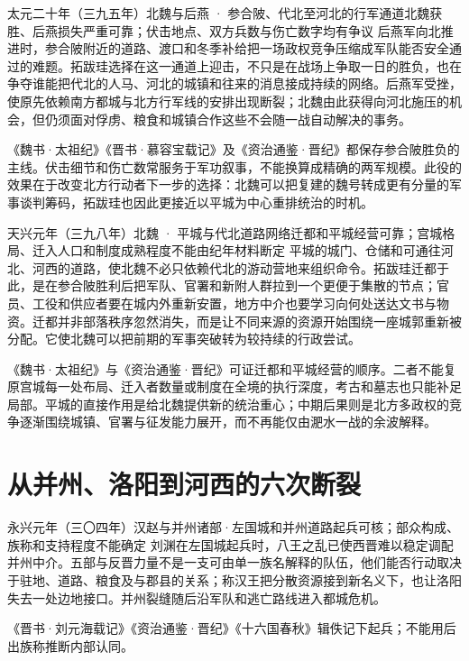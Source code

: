 \begin{event}{}{太元二十年（三九五年）}{北魏与后燕 · 参合陂、代北至河北的行军通道}{北魏获胜、后燕损失严重可靠；伏击地点、双方兵数与伤亡数字均有争议}
后燕军向北推进时，参合陂附近的道路、渡口和冬季补给把一场政权竞争压缩成军队能否安全通过的难题。拓跋珪选择在这一通道上迎击，不只是在战场上争取一日的胜负，也在争夺谁能把代北的人马、河北的城镇和往来的消息接成持续的网络。后燕军受挫，使原先依赖南方都城与北方行军线的安排出现断裂；北魏由此获得向河北施压的机会，但仍须面对俘虏、粮食和城镇合作这些不会随一战自动解决的事务。

《魏书·太祖纪》《晋书·慕容宝载记》及《资治通鉴·晋纪》都保存参合陂胜负的主线。伏击细节和伤亡数常服务于军功叙事，不能换算成精确的两军规模。此役的效果在于改变北方行动者下一步的选择：北魏可以把复建的魏号转成更有分量的军事谈判筹码，拓跋珪也因此更接近以平城为中心重排统治的时机。
\end{event}

\begin{event}{}{天兴元年（三九八年）}{北魏 · 平城与代北道路网络}{迁都和平城经营可靠；宫城格局、迁入人口和制度成熟程度不能由纪年材料断定}
平城的城门、仓储和可通往河北、河西的道路，使北魏不必只依赖代北的游动营地来组织命令。拓跋珪迁都于此，是在参合陂胜利后把军队、官署和新附人群拉到一个更便于集散的节点；官员、工役和供应者要在城内外重新安置，地方中介也要学习向何处送达文书与物资。迁都并非部落秩序忽然消失，而是让不同来源的资源开始围绕一座城郭重新被分配。它使北魏可以把前期的军事突破转为较持续的行政尝试。

《魏书·太祖纪》与《资治通鉴·晋纪》可证迁都和平城经营的顺序。二者不能复原宫城每一处布局、迁入者数量或制度在全境的执行深度，考古和墓志也只能补足局部。平城的直接作用是给北魏提供新的统治重心；中期后果则是北方多政权的竞争逐渐围绕城镇、官署与征发能力展开，而不再能仅由淝水一战的余波解释。
\end{event}

\section{从并州、洛阳到河西的六次断裂}
\begin{event}{}{永兴元年（三〇四年）}{汉赵与并州诸部·左国城和并州道路}{起兵可核；部众构成、族称和支持程度不能确定}
刘渊在左国城起兵时，八王之乱已使西晋难以稳定调配并州中介。五部与反晋力量不是一支可由单一族名解释的队伍，他们能否行动取决于驻地、道路、粮食及与郡县的关系；称汉王把分散资源接到新名义下，也让洛阳失去一处边地接口。并州裂缝随后沿军队和逃亡路线进入都城危机。

《晋书·刘元海载记》《资治通鉴·晋纪》《十六国春秋》辑佚记下起兵；不能用后出族称推断内部认同。
\end{event}

